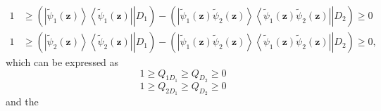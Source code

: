 \documentclass[aps,preprint]{revtex4}%
\begin{document}
\begin{enumerate}
\begin{align}
1  &  \geq\left(  \left.  \left\vert \tilde{\psi}_{1}\left(  \mathbf{z}%
\right)  \right\rangle \left\langle \tilde{\psi}_{1}\left(  \mathbf{z}\right)
\right\vert \right\vert D_{1}\right)  -\left(  \left.  \left\vert \tilde{\psi
}_{1}\left(  \mathbf{z}\right)  \tilde{\psi}_{2}\left(  \mathbf{z}\right)
\right\rangle \left\langle \tilde{\psi}_{1}\left(  \mathbf{z}\right)
\tilde{\psi}_{2}\left(  \mathbf{z}\right)  \right\vert \right\vert
D_{2}\right)  \geq0\nonumber\\
1  &  \geq\left(  \left.  \left\vert \tilde{\psi}_{2}\left(  \mathbf{z}%
\right)  \right\rangle \left\langle \tilde{\psi}_{2}\left(  \mathbf{z}\right)
\right\vert \right\vert D_{1}\right)  -\left(  \left.  \left\vert \tilde{\psi
}_{1}\left(  \mathbf{z}\right)  \tilde{\psi}_{2}\left(  \mathbf{z}\right)
\right\rangle \left\langle \tilde{\psi}_{1}\left(  \mathbf{z}\right)
\tilde{\psi}_{2}\left(  \mathbf{z}\right)  \right\vert \right\vert
D_{2}\right)  \geq0,
\end{align}
which can be expressed as
\begin{equation}
1\geq Q_{1D_{1}}\mathbf{\geq}Q_{D_{2}}\geq0
\end{equation}%
\begin{equation}
1\geq Q_{2D_{1}}\mathbf{\geq}Q_{D_{2}}\geq0
\end{equation}
and the


\end{enumerate}
\end{document}
